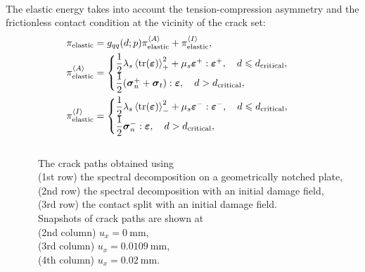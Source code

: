 \begin{frame}{}
\\
The elastic energy takes into account the tension-compression asymmetry and the frictionless contact condition at the vicinity of the crack set:
\begin{subequations}
\begin{align}
    \pi_{\text{elastic}} &= g_{qq}(d; p) \pi_{\text{elastic}}^{\left< A \right>} + \pi_{\text{elastic}}^{\left< I \right>}, \\
    \pi_{\text{elastic}}^{\left< A \right>} &=
    \begin{cases}
        \dfrac{1}{2} \lambda_s \left<\operatorname{tr}(\boldsymbol{\varepsilon})\right>_+^2 + \mu_s \boldsymbol{\varepsilon}^+ : \boldsymbol{\varepsilon}^+, \quad d \leqslant d_{\text{critical}}, \\
        \dfrac{1}{2} ( \boldsymbol{\sigma}_n^+ + \boldsymbol{\sigma}_t ) : \boldsymbol{\varepsilon}, \quad d > d_{\text{critical}},
    \end{cases} \\
    \pi_{\text{elastic}}^{\left< I \right>} &=
    \begin{cases}
        \dfrac{1}{2} \lambda_s \left<\operatorname{tr}(\boldsymbol{\varepsilon})\right>_-^2 + \mu_s \boldsymbol{\varepsilon}^- : \boldsymbol{\varepsilon}^-, \quad d \leqslant d_{\text{critical}}, \\
        \dfrac{1}{2} \boldsymbol{\sigma}_n^- : \boldsymbol{\varepsilon}, \quad d > d_{\text{critical}},
    \end{cases}
\end{align}
\end{subequations}
\end{frame}

\begin{frame}{}
\begin{columns}
    \begin{column}{0.7\textwidth}
        \vspace{-2em}
        
    \end{column}
    \begin{column}{0.3\textwidth}
        The crack paths obtained using \\
        (1st row) the spectral decomposition on a geometrically notched plate, \\
        (2nd row) the spectral decomposition with an initial damage field, \\
        (3rd row) the contact split with an initial damage field. \\
        \bigskip
        Snapshots of crack paths are shown at \\
        (2nd column) $u_x = \SI{0}{\milli\meter}$, \\
        (3rd column) $u_x = \SI{0.0109}{\milli\meter}$, \\
        (4th column) $u_x = \SI{0.02}{\milli\meter}$.
    \end{column}
\end{columns}
\end{frame}

